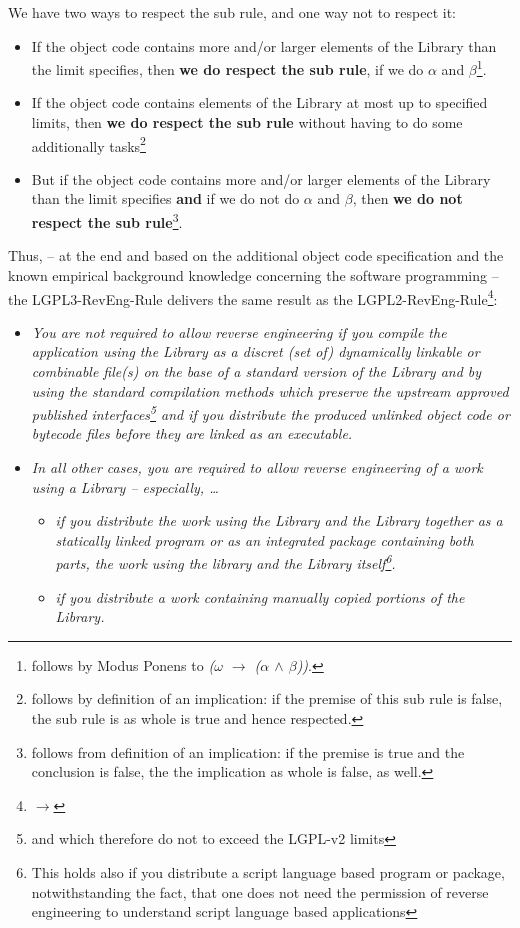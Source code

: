 We have two ways to respect the sub rule, and one way not to respect it:
\begin{itemize}
  \item If the object code contains more and/or larger elements of the Library
  than the limit specifies, then \textbf{we do respect the sub rule}, if we do
  $\alpha$ and $\beta$\footnote{follows by Modus Ponens to \emph{($\omega$
  $\rightarrow$ ($\alpha$ $\wedge$ $\beta$))}.}.
  \item If the object code contains elements of the Library at most up to
  specified limits, then \textbf{we do respect the sub rule} without having to
  do some additionally tasks\footnote{follows by definition of an implication:
  if the premise of this sub rule is false, the sub rule is as whole is true and
  hence respected.}
  \item But if the object code contains more and/or larger elements of the
  Library than the limit specifies \textbf{and} if we do not do $\alpha$ and
  $\beta$, then \textbf{we do not respect the sub rule}\footnote{follows from
  definition of an implication: if the premise is true and the conclusion is
  false, the the implication as whole is false, as well.}.
\end{itemize}

Thus, -- at the end and based on the additional object code specification and
the known empirical background knowledge concerning the software programming --
the LGPL3-RevEng-Rule delivers the same result as the
LGPL2-RevEng-Rule\footnote{$\rightarrow$
\pageref{RevEngLgpl2ComplianceByRenverseEngine}}:

\begin{itemize}
  \item \emph{You are not required to allow reverse engineering if you compile
  the application using the Library as a discret (set of) dynamically linkable
  or combinable file(s) on the base of a standard version of the Library and by
  using the standard compilation methods which preserve the upstream approved
  published interfaces\footnote{and which therefore do not to exceed the LGPL-v2
  limits} and if you distribute the produced unlinked object code or bytecode
  files before they are linked as an executable.}
  \item \emph{In all other cases, you are required to allow reverse engineering
  of a work using a Library -- especially, \ldots}
  \begin{itemize}
    \item \emph{if you distribute the work using the Library and the Library
    together as a statically linked program or as an integrated package
    containing both parts, the work using the library and the Library
    itself\footnote{This holds also if you distribute a script language based
    program or package, notwithstanding the fact, that one does not need the
    permission of reverse engineering to understand script language based
    applications}.}
    \item \emph{if you distribute a work containing manually copied portions of
    the Library.}
  \end{itemize}
\end{itemize}



